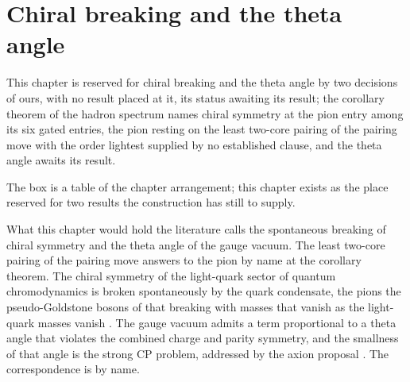 \section{Chiral breaking and the theta angle}\label{mod:VII-8-chiral-breaking-and-the-theta-angle}
\begin{chtable}
This chapter is reserved for chiral breaking and the theta angle by two decisions of ours, with no result placed at it, its status awaiting its result; the corollary theorem of the hadron spectrum names chiral symmetry at the pion entry among its six gated entries, the pion resting on the least two-core pairing of the pairing move with the order lightest supplied by no established clause, and the theta angle awaits its result.
\end{chtable}
\chdeps{}{}
The box is a table of the chapter arrangement; this chapter exists as the place reserved for two results the construction has still to supply.
\begin{chbridge}
What this chapter would hold the literature calls the spontaneous breaking of chiral symmetry and the theta angle of the gauge vacuum. The least two-core pairing of the pairing move answers to the pion by name at the corollary theorem. The chiral symmetry of the light-quark sector of quantum chromodynamics is broken spontaneously by the quark condensate, the pions the pseudo-Goldstone bosons of that breaking with masses that vanish as the light-quark masses vanish \cite{NambuJonaLasinio1961,Goldstone1961}. The gauge vacuum admits a term proportional to a theta angle that violates the combined charge and parity symmetry, and the smallness of that angle is the strong CP problem, addressed by the axion proposal \cite{tHooft1976,PecceiQuinn1977}. The correspondence is by name.
\end{chbridge}
